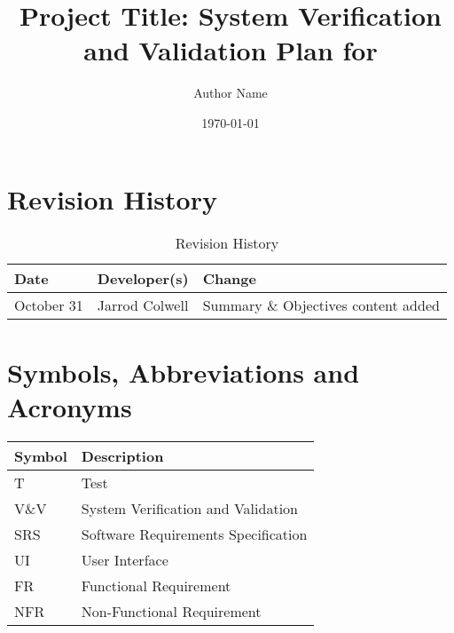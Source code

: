 \documentclass[12pt, titlepage]{article}
\begin{document}
\title{Project Title: System Verification and Validation Plan for \progname{}} 
\author{Author Name}
\date{\today}
	
\maketitle


\section*{Revision History}
\begin{table}[hp]
	\caption{Revision History} \label{TblRevisionHistory}
	\begin{tabularx}{\textwidth}{llX}
		\toprule
		\textbf{Date} & \textbf{Developer(s)} & \textbf{Change}\\
		\midrule
		October 31 & Jarrod Colwell & Summary \& Objectives content added\\
		\bottomrule
	\end{tabularx}
\end{table}

\newpage

\tableofcontents

\listoftables
{}

\listoffigures
{}

\newpage

\section{Symbols, Abbreviations and Acronyms}

\renewcommand{\arraystretch}{1.2}
\begin{tabular}{l | l} 
  \toprule		
  \textbf{Symbol} & \textbf{Description}\\
  \midrule 
  T & Test\\
  V\&V & System Verification and Validation\\
  SRS & Software Requirements Specification\\
  UI & User Interface\\
  FR & Functional Requirement\\
  NFR & Non-Functional Requirement\\
  \bottomrule
\end{tabular}\\
\end{document}
